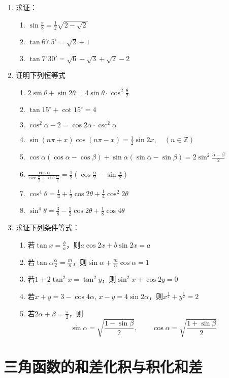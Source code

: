 \begin{enumerate}
\item 求证：
\begin{enumerate}
    \item $\sin\frac{\pi}{8}=\frac{1}{2}\sqrt{2-\sqrt{2}}$
    \item $\tan 67.5^{\circ}=\sqrt{2}+1$
    \item $\tan 7^{\circ}30'=\sqrt{6}-\sqrt{3}+\sqrt{2}-2$
\end{enumerate}
\item 证明下列恒等式
\begin{enumerate}
    \item $2\sin\theta+\sin2\theta=4\sin\theta\cdot \cos^2\frac{\theta}{2}$
    \item $\tan 15^{\circ}+\cot 15^{\circ}=4$
    \item $\cos^2\alpha-2=\cos2\alpha\cdot \csc^2\alpha$
    \item $\sin(n\pi+x)\cos(n\pi-x)=\frac{1}{2}\sin 2x,\quad (n\in \mathbb{Z})$
    \item $\cos\alpha(\cos\alpha-\cos\beta)+\sin\alpha(\sin\alpha-\sin\beta)=2\sin^2\frac{\alpha-\beta}{2}$
    \item $\frac{\cos\alpha}{\sec\frac{\alpha}{2}+\csc\frac{\alpha}{2}}=\frac{1}{2}\left(\cos\frac{\alpha}{2}-\sin\frac{\alpha}{2}\right)$
    \item $\cos^4\theta=\frac{1}{4}+\frac{1}{2}\cos2\theta+\frac{1}{4}\cos^2 2\theta$
    \item $\sin^4\theta=\frac{3}{8}-\frac{1}{2}\cos2\theta+\frac{1}{8}\cos4\theta$
\end{enumerate}

\item 求证下列条件等式：
\begin{enumerate}
    \item 若$\tan x=\frac{b}{a}$，则$a\cos 2x+b\sin 2x=a$
    \item 若$\tan\alpha\frac{\alpha}{2}=\frac{m}{n}$，则$\sin\alpha+\frac{m}{n}\cos\alpha=1$
    \item 若$1+2\tan^2 x=\tan^2 y$，则$\sin^2x+\cos 2y=0$
    \item 若$x+y=3-\cos4\alpha$, $x-y=4\sin2\alpha$，则$x^{\tfrac{1}{2}}+y^{\tfrac{1}{2}}=2$
    \item 若$2\alpha+\beta=\frac{\pi}{2}$，则
    \[\sin\alpha=\sqrt{\frac{1-\sin\beta}{2}},\qquad \cos\alpha=\sqrt{\frac{1+\sin\beta}{2}}\]
\end{enumerate}
\end{enumerate}

\section{三角函数的和差化积与积化和差}
